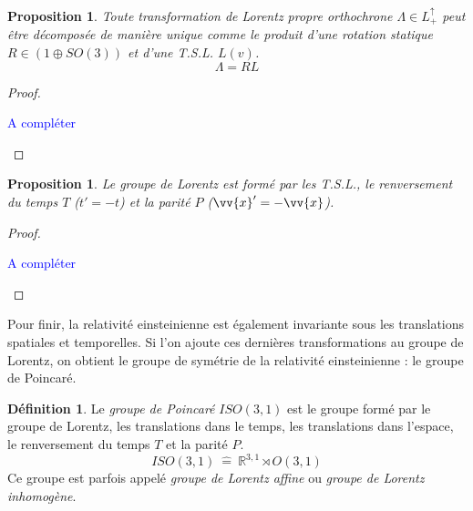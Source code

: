\documentclass[a4paper,11pt]{report}
\theoremstyle{definition}
\theoremstyle{plain}
\newtheorem{prop}[thm]{Proposition}
\theoremstyle{definition}
\newtheorem{defn}{Définition}[chapter]
\theoremstyle{remark}
\newcommand{\comp}{\begin{center}\textcolor{blue}{A compléter}\end{center}}
\begin{document}
            \begin{prop}
                Toute transformation de Lorentz propre orthochrone $\Lambda\in L^\uparrow_+$ peut être décomposée de manière unique comme le produit d'une rotation statique $R\in(1\oplus SO(3))$ et d'une T.S.L. $L(v)$.
                \begin{equation}
                    \Lambda = RL
                \end{equation}
            \end{prop}
            
            \begin{proof}${}$\\
                \comp                
            \end{proof}
            
            \begin{prop}
                Le groupe de Lorentz est formé par les T.S.L., le renversement du temps $T$ ($t'= -t$) et la parité $P$ ($\vv{x}' = -\vv{x}$).
            \end{prop}
            \begin{proof}${}$\\
                \comp
            \end{proof}
            
            Pour finir, la relativité einsteinienne est également invariante sous les translations spatiales et temporelles. Si l'on ajoute ces dernières transformations au groupe de Lorentz, on obtient le groupe de symétrie de la relativité einsteinienne : le groupe de Poincaré.
            \begin{defn}
                Le \textit{groupe de Poincaré} $ISO(3,1)$ est le groupe formé par le groupe de Lorentz, les translations dans le temps, les translations dans l'espace, le renversement du temps $T$ et la parité $P$.
                \begin{equation}
                    ISO(3,1) ~\hat{=}~ \mathbb{R}^{3,1}\rtimes O(3,1)
                \end{equation}
                Ce groupe est parfois appelé \textit{groupe de Lorentz affine} ou \textit{groupe de Lorentz inhomogène}.
            \end{defn}
            
\end{document}
